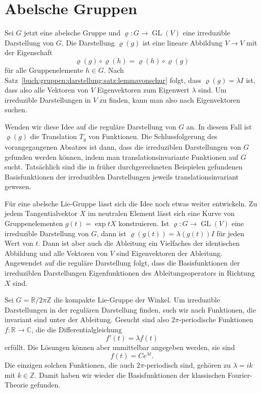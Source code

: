 %
%
%
\section{Abelsche Gruppen
\label{buch:gruppen:section:abelschegruppen}}
Sei $G$ jetzt eine abelsche Gruppe und $\varrho\colon G\to\operatorname{GL}(V)$
eine irreduzible Darstellung von $G$.
Die Darstellung $\varrho(g)$ ist eine lineare Abbildung $V\to V$ mit
der Eigenschaft
\[
\varrho(g)\circ\varrho(h) = \varrho(h)\circ\varrho(g)
\]
für alle Gruppenelemente $h\in G$.
Nach Satz~\ref{buch:gruppen:darstellung:satz:lemmavonschur}
folgt, dass $\varrho(g)=\lambda I$ ist, dass also alle Vektoren
von $V$ Eigenvektoren zum Eigenwert $\lambda$ sind.
Um irreduzible Darstellungen in $V$ zu finden, kann man also nach
Eigenvektoren suchen.

Wenden wir diese Idee auf die reguläre Darstellung von $G$ an.
In diesem Fall ist $\varrho(g)$ die Translation $T_g$ von Funktionen.
Die Schlussfolgerung des vorangegangenen Absatzes ist dann, dass die
irreduziblen Darstellungen von $G$ gefunden werden können, indem man
translationsinvariante Funktionen auf $G$ sucht.
Tatsächlich sind die in früher durchgerechneten Beispielen gefundenen
Basisfunktionen der irreduziblen Darstellungen jeweils translationsinvariant
gewesen.

Für eine abelsche Lie-Gruppe lässt sich die Idee noch etwas weiter
entwickeln.
Zu jedem Tangentialvektor $X$ im neutralen Element lässt sich eine
Kurve von Gruppenelementen $g(t)=\exp tX$ konstruieren.
Ist $\varrho\colon G\to\operatorname{GL}(V)$ eine irreduzible Darstellung
von $G$, dann ist $\varrho(g(t))=\lambda(g(t)) I$ für jeden Wert von $t$.
Dann ist aber auch die Ableitung ein Vielfaches der identischen Abbildung
und alle Vektoren von $V$ sind Eigenvektoren der Ableitung.
Angewendet auf die reguläre Darstellung folgt, dass die Basisfunktionen
der irreduziblen Darstellungen Eigenfunktionen des Ableitungsoperators
in Richtung $X$ sind.

\begin{beispiel}
Sei $G=\mathbb{R}/2\pi\mathbb{Z}$ die kompakte Lie-Gruppe der Winkel.
Um irreduzible Darstellungen in der regulären Darstellung finden, such
wir nach Funktionen, die invariant sind unter der Ableitung.
Gesucht sind also $2\pi$-periodische Funktionen
$f\colon\mathbb{R}\to\mathbb{C}$, die die Differentialgleichung
\[
f'(t) =\lambda f(t)
\]
erfüllt.
Die Lösungen können aber unmittelbar angegeben werden, sie sind
\[
f(t) = Ce^{\lambda t}.
\]
Die einzigen solchen Funktionen, die auch $2\pi$-periodisch sind, 
gehören zu $\lambda = ik$ mit $k\in \mathbb{Z}$.
Damit haben wir wieder die Basisfunktionen der klassischen Fourier-Theorie
gefunden.
\end{beispiel}


